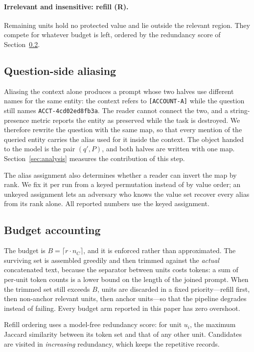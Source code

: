 \paragraph{Irrelevant and insensitive: refill (\textbf{R}).}
Remaining units hold no protected value and lie outside the relevant region. They compete
for whatever budget is left, ordered by the redundancy score of
Section~\ref{sec:method-budget}.

\subsection{Question-side aliasing}

Aliasing the context alone produces a prompt whose two halves use different names for the
same entity: the context refers to \texttt{[ACCOUNT-A]} while the question still names
\texttt{ACCT-4cd02ed8fb3a}. The reader cannot connect the two, and a string-presence metric
reports the entity as preserved while the task is destroyed. We therefore rewrite the
question with the same map, so that every mention of the queried entity carries the alias
used for it inside the context. The object handed to the model is the pair $(q',P)$, and both
halves are written with one map. Section~\ref{sec:analysis} measures the contribution of
this step.

The alias assignment also determines whether a reader can invert the map by rank. We fix it
per run from a keyed permutation instead of by value order; an unkeyed assignment lets an
adversary who knows the value set recover every alias from its rank alone. All reported
numbers use the keyed assignment.

\subsection{Budget accounting}
\label{sec:method-budget}

The budget is $B=\lceil r\cdot n_C\rceil$, and it is enforced rather than approximated. The
surviving set is assembled greedily and then trimmed against the \emph{actual} concatenated
text, because the separator between units costs tokens: a sum of per-unit token counts is a
lower bound on the length of the joined prompt. When the trimmed set still exceeds $B$,
units are discarded in a fixed priority---refill first, then non-anchor relevant units, then
anchor units---so that the pipeline degrades instead of failing. Every budget arm reported in
this paper has zero overshoot.

Refill ordering uses a model-free redundancy score: for unit $u_i$, the maximum Jaccard
similarity between its token set and that of any other unit. Candidates are visited in
\emph{increasing} redundancy, which keeps the repetitive records.

